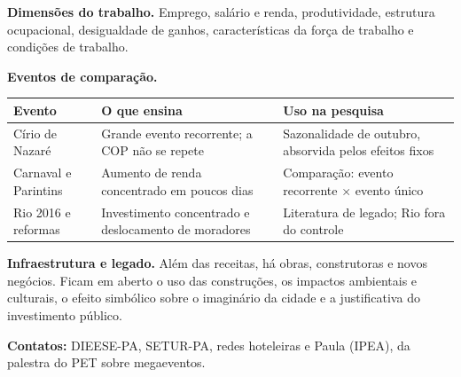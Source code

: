 \textbf{Dimensões do trabalho.} Emprego, salário e renda, produtividade, estrutura ocupacional,
desigualdade de ganhos, características da força de trabalho e condições de trabalho.

\textbf{Eventos de comparação.}
\begin{table}[H]
\centering\small
\begin{tabularx}{\linewidth}{p{3.2cm}LL}
\toprule
\textbf{Evento} & \textbf{O que ensina} & \textbf{Uso na pesquisa}\\
\midrule
Círio de Nazaré & Grande evento recorrente; a COP não se repete & Sazonalidade de outubro, absorvida pelos efeitos fixos\\
Carnaval e Parintins & Aumento de renda concentrado em poucos dias & Comparação: evento recorrente $\times$ evento único\\
Rio 2016 e reformas & Investimento concentrado e deslocamento de moradores & Literatura de legado; Rio fora do controle\\
\bottomrule
\end{tabularx}
\end{table}

\textbf{Infraestrutura e legado.} Além das receitas, há obras, construtoras e novos negócios. Ficam em
aberto o uso das construções, os impactos ambientais e culturais, o efeito simbólico sobre o imaginário
da cidade e a justificativa do investimento público.

\textbf{Contatos:} DIEESE-PA, SETUR-PA, redes hoteleiras e Paula (IPEA), da palestra do PET sobre
megaeventos.


